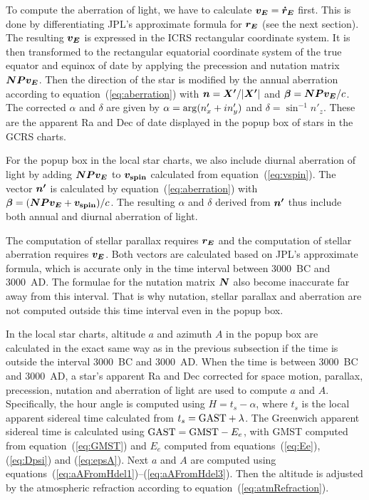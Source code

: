 \documentclass[12pt]{article}
\newcommand{\ve}[1]{\mbox{\boldmath $#1$}}
\begin{document}
To compute the aberration of light, we have to calculate $\ve{v_E}=\ve{\dot{r}_E}$ 
first. This is done by differentiating JPL's approximate formula for $\ve{r_E}$ 
(see the next section). The resulting $\ve{v_E}$ is expressed in the ICRS rectangular 
coordinate system. It is then transformed to the rectangular equatorial coordinate system 
of the true equator and equinox of date by applying the precession and 
nutation matrix $\ve{NPv_E}$. Then the direction 
of the star is modified by the annual aberration according to equation~(\ref{eq:aberration}) 
with $\ve{n}=\ve{X'}/|\ve{X'}|$ and 
$\ve{\beta} = \ve{N P v_E}/c$. The corrected $\alpha$ and $\delta$ are given by 
$\alpha = {\rm arg}(n'_x + i n'_y)$ and $\delta = \sin^{-1} n'_z$. These are the 
apparent Ra and Dec of date displayed in the popup box of stars in the GCRS charts. 

For the popup box in the local star charts, we also include diurnal aberration of 
light by adding $\ve{NPv_E}$ to $\ve{v_{\rm spin}}$ calculated from 
equation~(\ref{eq:vspin}). The vector $\ve{n'}$ is calculated by 
equation~(\ref{eq:aberration}) with $\ve{\beta}=(\ve{NPv_E}+\ve{v_{\rm spin}})/c$. 
The resulting $\alpha$ and $\delta$ derived from $\ve{n'}$ thus include both 
annual and diurnal aberration of light. 

The computation of stellar parallax requires $\ve{r_E}$ and the computation 
of stellar aberration requires $\ve{v_E}$. Both vectors are calculated based on 
JPL's approximate formula, which is accurate only in the time interval between 
3000~BC and 3000~AD. The formulae for the nutation matrix $\ve{N}$ also 
become inaccurate far away from this interval. That is why nutation, stellar parallax 
and aberration are not computed outside this time interval even in the popup box.

In the local star charts, altitude $a$ and azimuth $A$ in the popup box are 
calculated in the exact same way as in the previous subsection if the time 
is outside the interval 3000~BC and 3000~AD. When the time is between 3000~BC 
and 3000~AD, a star's apparent Ra and Dec corrected for space motion, parallax, 
precession, nutation and aberration of light are used to compute $a$ and $A$. 
Specifically, the hour angle is computed using $H=t_s-\alpha$, where $t_s$ 
is the local apparent sidereal time calculated from 
$t_s={\rm GAST}+\lambda$. The Greenwich apparent sidereal time is calculated 
using ${\rm GAST = GMST} - E_e$, with GMST computed from equation~(\ref{eq:GMST}) 
and $E_e$ computed from equations~(\ref{eq:Ee}), (\ref{eq:Dpsi}) and (\ref{eq:epsA}). 
Next $a$ and $A$ are computed using
equations~(\ref{eq:aAFromHdel1})--(\ref{eq:aAFromHdel3}). Then the altitude
is adjusted by the atmospheric refraction according to equation~(\ref{eq:atmRefraction}).
\end{document}
